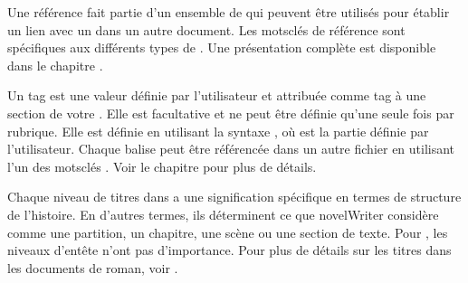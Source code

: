 \documentclass[a4paper,11pt,french]{sphinxmanual}
\begin{document}
\begin{description}
\sphinxAtStartPar
Une référence fait partie d’un ensemble de {\hyperref[\detokenize{int_glossary:term-Keyword}]{}} qui peuvent être utilisés pour établir un lien avec un {\hyperref[\detokenize{int_glossary:term-Tag}]{}} dans un autre document. Les mots\sphinxhyphen{}clés de référence sont spécifiques aux différents types de {\hyperref[\detokenize{int_glossary:term-Root-Folder}]{}}. Une présentation complète est disponible dans le chapitre {\hyperref[\detokenize{project_references:a-references}]{}}.

\sphinxAtStartPar
Un tag est une valeur définie par l’utilisateur et attribuée comme tag à une section de votre {\hyperref[\detokenize{int_glossary:term-Project-Notes}]{}}. Elle est facultative et ne peut être définie qu’une seule fois par rubrique. Elle est définie en utilisant la syntaxe {\hyperref[\detokenize{int_glossary:term-Keyword}]{}} , où  est la partie définie par l’utilisateur. Chaque balise peut être référencée dans un autre fichier en utilisant l’un des mots\sphinxhyphen{}clés {\hyperref[\detokenize{int_glossary:term-Reference}]{}}. Voir le chapitre {\hyperref[\detokenize{project_references:a-references}]{}} pour plus de détails.

\sphinxAtStartPar
Chaque niveau de titres dans {\hyperref[\detokenize{int_glossary:term-Novel-Documents}]{}} a une signification spécifique en termes de structure de l’histoire. En d’autres termes, ils déterminent ce que novelWriter considère comme une partition, un chapitre, une scène ou une section de texte. Pour {\hyperref[\detokenize{int_glossary:term-Project-Notes}]{}}, les niveaux d’en\sphinxhyphen{}tête n’ont pas d’importance. Pour plus de détails sur les titres dans les documents de roman, voir {\hyperref[\detokenize{project_structure:a-struct-heads}]{}}.

\end{description}
\end{document}
